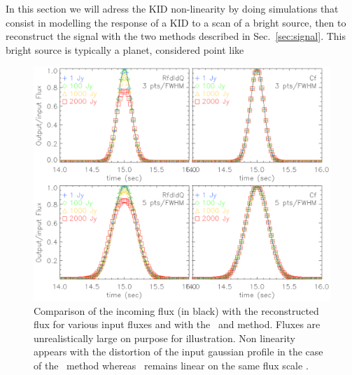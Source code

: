 In this section we will adress the KID non-linearity by doing simulations that consist in modelling the response of a KID to a scan of a bright source, then to reconstruct the signal with the two methods described in Sec.~\ref{sec:signal}. This bright source is typically a planet, considered point like 

\begin{figure}[h]
\center
\includegraphics[clip, angle=0, width=\columnwidth]{Figures/planet_profiles.eps}
\caption{Comparison of the incoming flux (in black) with the reconstructed flux
  for various input fluxes and with the \rf\ and \cf method. Fluxes are
  unrealistically large on purpose for illustration. Non linearity
  appears with the distortion of the input gaussian profile in the case of the
  \rf\ method whereas \cf\ remains linear on the same flux scale .}
\label{fig:planets}
\end{figure}

